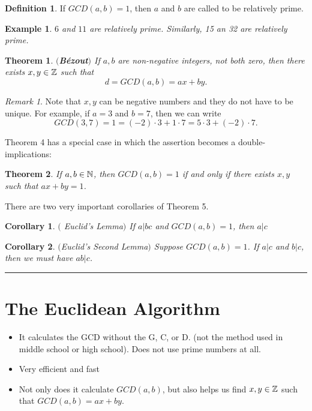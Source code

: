 \documentclass[12pt]{article}
\theoremstyle{plain}
\newtheorem{corollary}{Corollary}
\newtheorem{example}{Example}
\newtheorem{theorem}{Theorem}
\theoremstyle{definition}
\newtheorem{definition}{Definition}
\theoremstyle{remark}
\newtheorem{remark}{Remark}
\begin{document}
\begin{definition}
If $GCD(a,b)=1$, then $a$ and $b$ are called to be relatively prime.
\end{definition}

\begin{example}
$6$ and $11$ are relatively prime. Similarly, 15 an 32 are relatively prime.
\end{example}

\begin{theorem} {\bf $($B\'ezout$)$}
If $a, b$ are non-negative integers, not both zero, then there exists $x, y \in \mathbb{Z}$ such that
$$d=GCD(a,b) = ax+by.$$
\end{theorem}

\bigskip
\begin{remark}
Note that $x, y$ can be negative numbers and they do not have to be unique. For example, if $a=3$ and $b=7$, then we can write
$$GCD(3,7) = 1 = (-2)\cdot 3+1\cdot 7 = 5\cdot 3+(-2)\cdot 7.$$
\end{remark}

\bigskip
\noindent
Theorem 4 has a special case in which the assertion becomes a double-implications:

\begin{theorem}
If $a, b\in \mathbb{N}$, then $GCD(a,b) = 1$ if and only if there exists $x, y$ such that $ax+by = 1$.
\end{theorem}

There are two very important corollaries of Theorem 5.

\begin{corollary} $($ Euclid's Lemma$)$
If $a|bc$ and $GCD(a,b)=1$, then $a|c$
\end{corollary}

\begin{corollary} $($Euclid's Second Lemma$)$
Suppose $GCD(a,b)=1$. If $a|c$ and $b|c$, then we must have $ab|c$.
\end{corollary}

\bigskip
\hrule

\section{The Euclidean Algorithm}
\begin{itemize}
    \item It calculates the GCD without the G, C, or D. (not the method used in middle school or high school). Does not use prime numbers at all.
    \item Very efficient and fast
    \item Not only does it calculate $GCD(a,b)$, but also helps us find $x, y\in \mathbb{Z}$ such that $GCD(a,b)=ax+by$.
\end{itemize}
\end{document}
